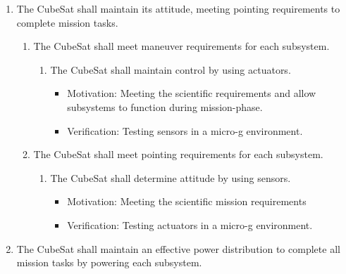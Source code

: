 \begin{enumerate}
\begin{enumerate}
\begin{enumerate}
\begin{enumerate}
\begin{itemize}
                                \item Verification:Test rig should be constructed to mimic the pusher plate and spring ejection system, with full functional verification of CubeSat performed afterwards along with manual inspection to ensure all parts remain in place 
                            \end{itemize}
                \end{enumerate}
        \end{enumerate}
    \end{enumerate} %
    \item The CubeSat shall maintain its attitude, meeting pointing requirements to complete mission tasks.
    \begin{enumerate}
        \item The CubeSat shall meet maneuver requirements for each subsystem.
        \begin{enumerate}
            \item The CubeSat shall maintain control by using actuators. 
                \begin{itemize}
                    \item Motivation: Meeting the scientific requirements and allow subsystems to function during mission-phase.
                    \item Verification: Testing sensors in a micro-g environment.
                \end{itemize}
        \end{enumerate}
        \item The CubeSat shall meet pointing requirements for each subsystem.
        \begin{enumerate}
            \item The CubeSat shall determine attitude by using sensors.
                \begin{itemize}
                    \item Motivation: Meeting the scientific mission requirements
                    \item Verification: Testing actuators in a micro-g environment.
                \end{itemize}
        \end{enumerate}
    \end{enumerate} %
    \item The CubeSat shall maintain an effective power distribution to complete all mission tasks by powering each subsystem. 

\end{enumerate}
